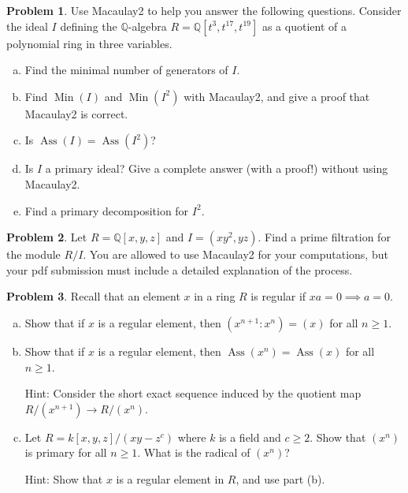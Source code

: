 \documentclass[11pt]{article}
\DeclareMathOperator{\Ass}{Ass}
\DeclareMathOperator{\Min}{Min}
\theoremstyle{definition}
\newtheorem{problem}{Problem}
\begin{document}
\begin{problem}
	Use Macaulay2 to help you answer the following questions. Consider the ideal $I$ defining the $\mathbb{Q}$-algebra $R=\mathbb{Q}[t^3,t^{17},t^{19}]$ as a quotient of a polynomial ring in three variables.
	\begin{enumerate}[(a)]
		\item Find the minimal number of generators of $I$.
		\item Find $\Min(I)$ and $\Min(I^2)$ with Macaulay2, and give a proof that Macaulay2 is correct.
		\item Is $\Ass(I) = \Ass(I^2)$?
		\item Is $I$ a primary ideal? Give a complete answer (with a proof!) without using Macaulay2.
		\item Find a primary decomposition for $I^2$.
	\end{enumerate}
\end{problem}


\begin{problem}
	Let $R = \mathbb{Q}[x,y,z]$ and $I = (xy^2,yz)$. Find a prime filtration for the module $R/I$. You are allowed to use Macaulay2 for your computations, but your pdf submission must include a detailed explanation of the process. 
\end{problem}



\begin{problem}
	Recall that an element $x$ in a ring $R$ is regular if $xa = 0 \implies a = 0$. 
	\begin{enumerate}[a)]
		\item Show that if $x$ is a regular element, then $(x^{n+1} : x^{n}) = (x)$ for all $n \geqslant 1$.
		\item Show that if $x$ is a regular element, then $\Ass(x^n) = \Ass(x)$ for all $n \geqslant 1$.
		
		\noindent
		Hint: Consider the short exact sequence induced by the quotient map $R/(x^{n+1}) \to R/(x^n)$.
		
		\item Let $R = k[x,y,z]/(xy-z^c)$ where $k$ is a field and $c \geqslant 2$. Show that $(x^n)$ is primary for all $n \geqslant 1$. What is the radical of $(x^n)$?
		
		
		\noindent
		Hint: Show that $x$ is a regular element in $R$, and use part (b).
	\end{enumerate}	
\end{problem}


\newpage
\end{document}
